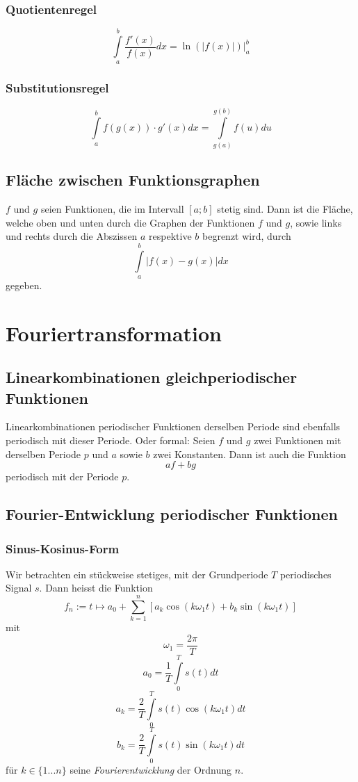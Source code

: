 \documentclass[10pt,a4paper]{scrartcl}
\begin{document}
\subsubsection{Quotientenregel}

$$\int\limits_a^b \frac{f'(x)}{f(x)} dx = \ln(|f(x)|)\Big |_a^b$$


\subsubsection{Substitutionsregel}

$$\int\limits_a^b f(g(x)) \cdot g'(x) dx = \int\limits_{g(a)}^{g(b)} f(u) du$$


\subsection{Fläche zwischen Funktionsgraphen} 

$f$ und $g$ seien Funktionen, die im Intervall $[a;b]$ stetig sind. Dann ist
die Fläche, welche oben und unten durch die Graphen der Funktionen $f$ und $g$,
sowie links und rechts durch die Abszissen $a$ respektive $b$ begrenzt wird,
durch
$$\int\limits_a^b |f(x) - g(x)| dx$$
gegeben.


\section{Fouriertransformation}


\subsection{Linearkombinationen gleichperiodischer Funktionen}

Linearkombinationen periodischer Funktionen derselben Periode sind ebenfalls
periodisch mit dieser Periode. Oder formal: Seien $f$ und $g$ zwei Funktionen
mit derselben Periode $p$ und $a$ sowie $b$ zwei Konstanten. Dann ist auch die
Funktion
$$af+bg$$
periodisch mit der Periode $p$.


\subsection{Fourier-Entwicklung periodischer Funktionen}


\subsubsection{Sinus-Kosinus-Form}
Wir betrachten ein stückweise stetiges, mit der Grundperiode $T$
periodisches Signal $s$. Dann heisst die Funktion
$$f_n := t \mapsto a_0 + \sum_{k=1}^n \left[ a_k \cos(k\omega_1t)
    + b_k\sin(k\omega_1t)\right]$$
mit
$$\omega_1 = \frac{2\pi}{T}$$
$$a_0 = \frac{1}{T} \int\limits_0^T s(t) dt$$
$$a_k = \frac{2}{T} \int\limits_0^T s(t) \cos(k\omega_1t) dt$$
$$b_k = \frac{2}{T}\int\limits_0^T s(t) \sin(k\omega_1t) dt$$
für $k \in \{1...n\}$ seine \emph{Fourierentwicklung} der Ordnung $n$.
\end{document}
